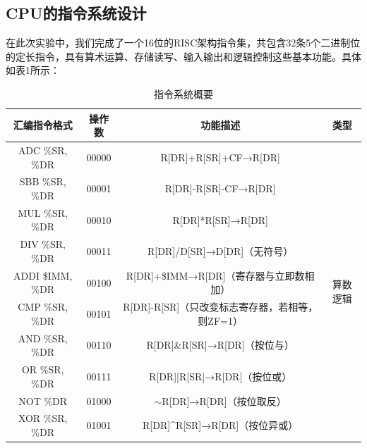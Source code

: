 \documentclass[titlepage, 11pt]{article}
\begin{document}
	\subsection{CPU的指令系统设计}
	在此次实验中，我们完成了一个16位的RISC架构指令集，共包含32条5个二进制位的定长指令，具有算术运算、存储读写、输入输出和逻辑控制这些基本功能。具体如表1所示：
	\begin{table}[H]
		\centering
		\footnotesize
		\caption{指令系统概要}
		\label{my-label}
		\begin{tabular}{c|c|c|c}
			汇编指令格式            & 操作数   & 功能描述                                                           & 类型                     \\ \hline
			ADC \%SR, \%DR    & 00000 & R{[}DR{]}+R{[}SR{]}+CF→R{[}DR{]}                               & \multirow{14}{*}{算数逻辑} \\ \cline{1-3}
			SBB \%SR, \%DR    & 00001 & R{[}DR{]}-R{[}SR{]}-CF→R{[}DR{]}                               &                        \\ \cline{1-3}
			MUL \%SR, \%DR    & 00010 & R{[}DR{]}*R{[}SR{]}→R{[}DR{]}                                  &                        \\ \cline{1-3}
			DIV \%SR, \%DR    & 00011 & R{[}DR{]}/D{[}SR{]}→D{[}DR{]}（无符号）                             &                        \\ \cline{1-3}
			ADDI \$IMM, \%DR  & 00100 & R{[}DR{]}+\$IMM→R{[}DR{]}（寄存器与立即数相加）                           &                        \\ \cline{1-3}
			CMP \%SR, \%DR    & 00101 & R{[}DR{]}-R{[}SR{]}（只改变标志寄存器，若相等，则ZF=1）                        &                        \\ \cline{1-3}
			AND \%SR, \%DR    & 00110 & R{[}DR{]}\&R{[}SR{]}→R{[}DR{]}（按位与）                            &                        \\ \cline{1-3}
			OR \%SR, \%DR     & 00111 & R{[}DR{]}|R{[}SR{]}→R{[}DR{]}（按位或）                             &                        \\ \cline{1-3}
			NOT \%DR          & 01000 & $\sim$R{[}DR{]}→R{[}DR{]}（按位取反）                                &                        \\ \cline{1-3}
			XOR \%SR, \%DR    & 01001 & R{[}DR{]}\textasciicircum R{[}SR{]}→R{[}DR{]}（按位异或）            &                        \\ \cline{1-3}

\end{tabular}
\end{table}
\end{document}
